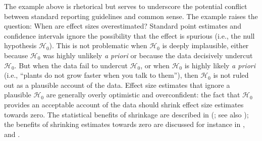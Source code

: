 \documentclass[a4paper]{article}
\newcommand{\EJ}[1]{\todo[inline, color=green]{  #1 }}
\newcommand{\DON}[1]{\todo[inline, color=white]{Don: #1}}
\newenvironment{revision}{\color{teal}}{\color{black}}
\begin{document}
\begin{revision}%
The example above is rhetorical but serves to underscore the potential conflict between standard reporting guidelines and common sense. The example raises the question: When are effect sizes overestimated?
\end{revision}%
Standard point estimates and confidence intervals ignore the possibility that the effect is spurious (i.e., the null hypothesis $\mathcal{H}_0$). This is not problematic when $\mathcal{H}_0$ is deeply implausible, either because $\mathcal{H}_0$ was highly unlikely \emph{a priori} or because the data decisively undercut $\mathcal{H}_0$. But when the data fail to undercut $\mathcal{H}_0$, or when $\mathcal{H}_0$ is highly likely \emph{a priori} (i.e., ``plants do not grow faster when you talk to them''), then $\mathcal{H}_0$ is not ruled out as a plausible account of the data. Effect size estimates that ignore a plausible $\mathcal{H}_0$ are generally \begin{revision}overly optimistic and\end{revision} overconfident: the fact that $\mathcal{H}_0$ provides an acceptable account of the data should shrink effect size estimates towards zero.
\begin{revision}%
The statistical benefits of shrinkage are described in \citeauthor{EfronMorris1977} (\citeyear{EfronMorris1977}; see also \cite{davis2018estimation, RouderLu2005, ShiffrinEtAl2008}); the benefits of shrinking estimates towards zero are discussed for instance in \textcite{IversonEtAl2010, george1993variable}, and \textcite{vanErp2019shrinkage}.
\end{revision}
\end{document}
